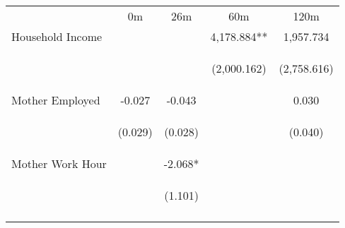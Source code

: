 \begin{tabular}{lcccc}
\hline \noalign{\smallskip} & 0m & 26m & 60m & 120m\\
\noalign{\smallskip}\hline \noalign{\smallskip}Household Income &  &  & 4,178.884** & 1,957.734\\
 & \begin{footnotesize}\end{footnotesize} & \begin{footnotesize}\end{footnotesize} & \begin{footnotesize}(2,000.162)\end{footnotesize} & \begin{footnotesize}(2,758.616)\end{footnotesize}\\
\noalign{\smallskip}Mother Employed & -0.027 & -0.043 &  & 0.030\\
 & \begin{footnotesize}(0.029)\end{footnotesize} & \begin{footnotesize}(0.028)\end{footnotesize} & \begin{footnotesize}\end{footnotesize} & \begin{footnotesize}(0.040)\end{footnotesize}\\
\noalign{\smallskip}Mother Work Hour &  & -2.068* &  & \\
 & \begin{footnotesize}\end{footnotesize} & \begin{footnotesize}(1.101)\end{footnotesize} & \begin{footnotesize}\end{footnotesize} & \begin{footnotesize}\end{footnotesize}\\
\noalign{\smallskip}\hline\end{tabular}\\
